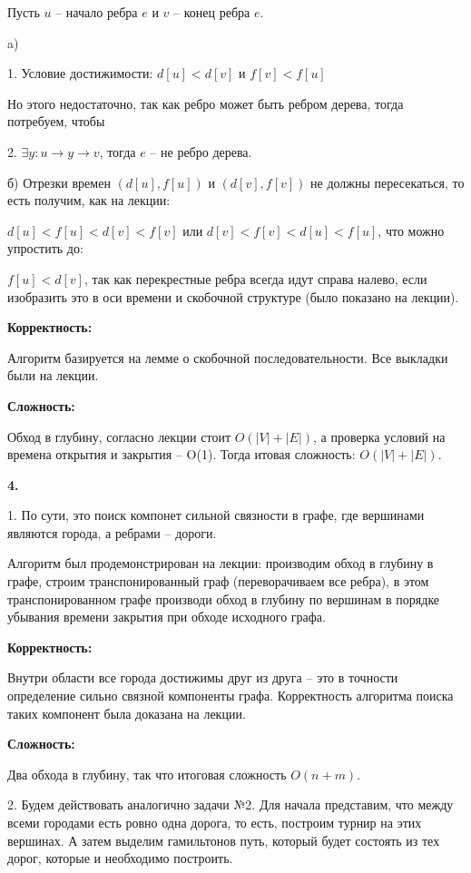\documentclass[12pt]{extreport}
\begin{document}
Пусть $u$ -- начало ребра $e$ и $v$ -- конец ребра $e$. 

a) 

1. Условие достижимости: $d[u] <d[v]$ и $f[v] <f[u]$ 

Но этого недостаточно, так как ребро может быть ребром дерева, тогда потребуем, чтобы 

2. $\exists y: u \rightarrow y \rightarrow v$, тогда $e$ -- не ребро дерева.

б) Отрезки времен $(d[u], f[u])$ и $(d[v], f[v])$ не должны пересекаться, то есть получим, как на лекции: 

$d[u] < f[u] < d[v] < f[v]$ или $d[v] < f[v] < d[u] < f[u]$, что можно упростить до: 

$f[u]<d[v]$, так как перекрестные ребра всегда идут справа налево, если изобразить это в оси времени и скобочной структуре (было показано на лекции).

\bigskip 
{\bf Корректность:}

Алгоритм базируется на лемме о скобочной последовательности. Все выкладки были на лекции.

\bigskip 
{\bf Сложность:} 

Обход в глубину, согласно лекции стоит $O(|V|+|E|)$, а проверка условий на времена открытия и закрытия -- O(1). Тогда итовая сложность: $O(|V|+|E|)$.

\bigskip 
{\bf 4.} 

1. По сути, это поиск компонет сильной связности в графе, где вершинами являются города, а ребрами -- дороги.

Алгоритм был продемонстрирован на лекции: производим обход в глубину в графе, строим транспонированный граф (переворачиваем все ребра), в этом транспонированном графе производи обход в глубину по вершинам в порядке убывания времени закрытия при обходе исходного графа. 

\bigskip 
{\bf Корректность:}

Внутри области все города достижимы друг из друга -- это в точности определение сильно связной компоненты графа. Корректность алгоритма поиска таких компонент была доказана на лекции. 

\bigskip 
{\bf Сложность:} 

Два обхода в глубину, так что итоговая сложность $O(n+m)$.

\bigskip 

2. Будем действовать аналогично задачи №2. Для начала представим, что между всеми городами есть ровно одна дорога, то есть, построим турнир на этих вершинах. А затем выделим гамильтонов путь, который будет состоять из тех дорог, которые и необходимо построить. 
 
\end{document}
